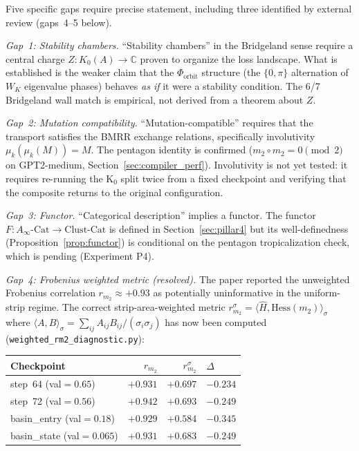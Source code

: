 \documentclass[11pt]{amsart}
\begin{document}
Five specific gaps require precise statement, including three identified
by external review (gaps~4--5 below).

\emph{Gap~1: Stability chambers.}
``Stability chambers'' in the Bridgeland sense require a central
charge $Z: K_0(A) \to \mathbb{C}$ proven to organize the loss
landscape.
What is established is the weaker claim that the $\Phi_\mathrm{orbit}$
structure (the $\{0,\pi\}$ alternation of $W_K$ eigenvalue phases)
behaves \emph{as if} it were a stability condition.
The 6/7 Bridgeland wall match is empirical, not derived from a theorem
about $Z$.

\emph{Gap~2: Mutation compatibility.}
``Mutation-compatible'' requires that the transport satisfies the
BMRR exchange relations, specifically involutivity
$\mu_k(\mu_k(M)) = M$.
The pentagon identity is confirmed ($m_2 \circ m_2 = 0 \pmod 2$
on GPT2-medium, Section~\ref{sec:compiler_perf}).
Involutivity is not yet tested: it requires re-running the K$_0$
split twice from a fixed checkpoint and verifying that the composite
returns to the original configuration.

\emph{Gap~3: Functor.}
``Categorical description'' implies a functor.
The functor $F: A_\infty\text{-Cat} \to \mathrm{Clust\text{-}Cat}$
is defined in Section~\ref{sec:pillar4} but its well-definedness
(Proposition~\ref{prop:functor}) is conditional on the pentagon
tropicalization check, which is pending (Experiment P4).


\emph{Gap~4: Frobenius weighted metric (resolved).}
The paper reported the unweighted Frobenius correlation $r_{m_2} \approx +0.93$
as potentially uninformative in the uniform-strip regime.
The correct strip-area-weighted metric
$r_{m_2}^\sigma = \langle \hat{H}, \mathrm{Hess}(m_2)\rangle_\sigma$
where $\langle A,B\rangle_\sigma = \sum_{ij} A_{ij}B_{ij}/(\sigma_i\sigma_j)$
has now been computed (\texttt{weighted\_rm2\_diagnostic.py}):

\begin{center}\small
\begin{tabular}{@{}lrrl@{}}
\toprule
Checkpoint & $r_{m_2}$ & $r_{m_2}^\sigma$ & $\Delta$ \\
\midrule
step~64 (val$=0.65$) & $+0.931$ & $+0.697$ & $-0.234$ \\
step~72 (val$=0.56$) & $+0.942$ & $+0.693$ & $-0.249$ \\
basin\_entry (val$=0.18$) & $+0.929$ & $+0.584$ & $-0.345$ \\
basin\_state (val$=0.065$) & $+0.931$ & $+0.683$ & $-0.249$ \\
\bottomrule
\end{tabular}
\end{center}
\end{document}
